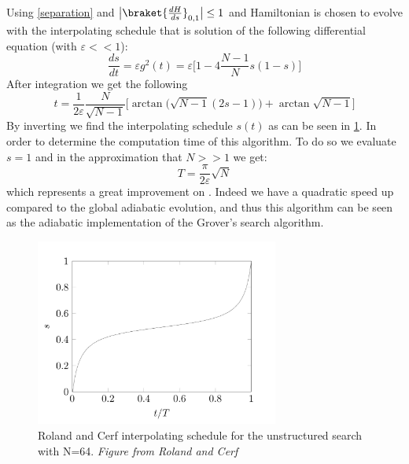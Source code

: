    Using \cref{separation} and $\big|\braket{\frac{dH}{ds}}_{0,1}\big| \leq 1$ and Hamiltonian is chosen to evolve with the interpolating schedule that is solution of the following differential equation (with $\varepsilon<<1$):
    \begin{equation}
      \frac{ds}{dt} = \varepsilon g^2(t) = \varepsilon\Big[1-4\frac{N-1}{N}s(1-s)\Big]
    \end{equation}
    After integration we get the following
    \begin{equation}
      t =\frac{1}{2\varepsilon}\frac{N}{\sqrt{N-1}}\Big[\arctan\big(\sqrt{N-1}(2s-1)\big) + \arctan{\sqrt{N-1}}\Big]
    \end{equation}
    By inverting we find the interpolating schedule $s(t)$ as can be seen in \cref{interpolating_schedule}. In order to determine the computation time of this algorithm. To do so we evaluate $s=1$ and in the approximation that $N>>1$ we get:
    \begin{equation}
      T = \frac{\pi}{2\varepsilon}\sqrt{N}
    \end{equation}
    which represents a great improvement on . Indeed we have a quadratic speed up compared to the global adiabatic evolution, and thus this algorithm can be seen as the adiabatic implementation of the Grover's search algorithm.
    \begin{figure}[!htb]
      \centering
      \includegraphics[width=80mm]{figures/chapter1/interpolating_schedule}
      \caption[Roland and Cerf interpolating schedule for the unstructured search with N=64]{Roland and Cerf interpolating schedule for the unstructured search with N=64. \textit{Figure from Roland and Cerf} \cite{Roland2002}}
      \label{interpolating_schedule}
    \end{figure}


\clearpage
